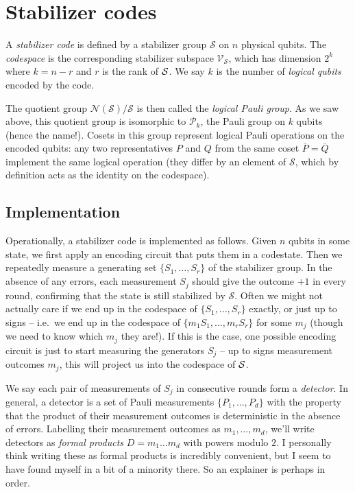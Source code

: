 \section{Stabilizer codes}\label{sec:stabilizer_codes}

A \emph{stabilizer code} is defined by a stabilizer group $\mathcal{S}$ on $n$ physical qubits.
The \emph{codespace} is the corresponding stabilizer subspace $\mathcal{V}_{\mathcal{S}}$, which has dimension $2^k$ where $k = n - r$ and $r$ is the rank of $\mathcal{S}$.
We say $k$ is the number of \emph{logical qubits} encoded by the code.

The quotient group $\mathcal{N}(\mathcal{S})/\mathcal{S}$ is then called the \emph{logical Pauli group}.
As we saw above, this quotient group is isomorphic to $\mathcal{P}_k$, the Pauli group on $k$ qubits (hence the name!).
Cosets in this group represent logical Pauli operations on the encoded qubits: any two representatives $P$ and $Q$ from the same coset $\overline{P} = \overline{Q}$ implement the same logical operation (they differ by an element of $\mathcal{S}$, which by definition acts as the identity on the codespace).

\subsection{Implementation}\label{subsec:stabilizer_codes_implementation}

Operationally, a stabilizer code is implemented as follows.
Given $n$ qubits in some state, we first apply an encoding circuit that puts them in a codestate.
Then we repeatedly measure a generating set $\{S_1, \ldots, S_r\}$ of the stabilizer group.
In the absence of any errors, each measurement $S_j$ should give the outcome $+1$ in every round, confirming that the state is still stabilized by $\mathcal{S}$.
Often we might not actually care if we end up in the codespace of $\{S_1, \ldots, S_r\}$ exactly, or just up to signs -- i.e.\ we end up in the codespace of $\{m_1 S_1, \ldots, m_r S_r\}$ for some $m_j$ (though we need to know which $m_j$ they are!).
If this is the case, one possible encoding circuit is just to start measuring the generators $S_j$ -- up to signs measurement outcomes $m_j$, this will project us into the codespace of $\mathcal{S}$.

We say each pair of measurements of $S_j$ in consecutive rounds form a \textit{detector}.
In general, a detector is a set of Pauli measurements $\{P_1, \ldots, P_d\}$ with the property that the product of their measurement outcomes is deterministic in the absence of errors.
Labelling their measurement outcomes as $m_1, \ldots, m_d$, we'll write detectors as \textit{formal products} $D = m_1 \ldots m_d$ with powers modulo $2$.
I personally think writing these as formal products is incredibly convenient, but I seem to have found myself in a bit of a minority there.
So an explainer is perhaps in order.

